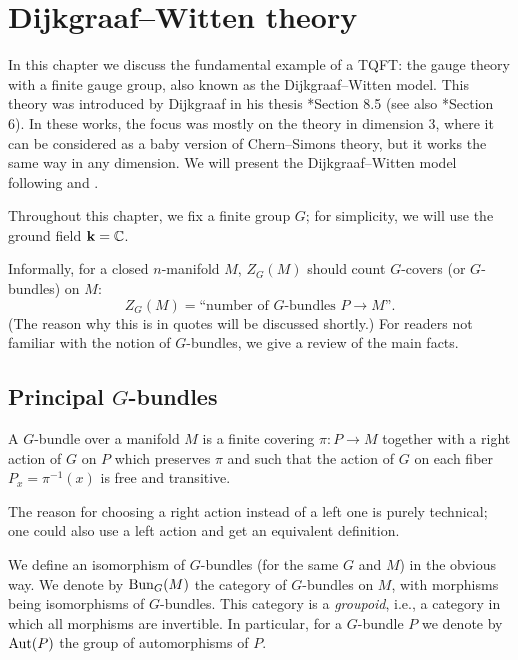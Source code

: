 \chapter{Dijkgraaf--Witten theory}\label{c:DW}
In this chapter we discuss the fundamental example of a TQFT:
the gauge theory with a finite gauge group, also known as the Dijkgraaf--Witten
model. This theory was introduced by Dijkgraaf in his thesis
*{Section 8.5} (see also *{Section 6}). In
these works, the focus was mostly on the theory in dimension 3, where it can be
considered as a baby version of Chern--Simons theory, but it works the same way
in any dimension. We will present the Dijkgraaf--Witten model following
 and .

Throughout this chapter, we fix a finite group $G$; for simplicity, we will
use the ground field $\mathbf{k}=\mathbb{C}$.

Informally, for a closed $n$-manifold $M$, $Z_G(M)$ should count $G$-covers
(or $G$-bundles) on $M$:
\begin{equation}\label{e:dw-informal}
  Z_G(M)=\text{``number of $G$-bundles $P\to M$''}.
\end{equation}
(The reason why this is in quotes will be discussed shortly.) For readers
not familiar with the notion of $G$-bundles, we give a review of the main
facts.

\section{Principal $G$-bundles}\label{s:principal-bundles}

\begin{definition}\label{d:G-bundle}
  A $G$-bundle over a manifold $M$ is a finite covering $\pi\colon P\to M$
  together with a right action of $G$ on $P$ which preserves $\pi$ and
  such that the action of $G$ on each fiber $P_x=\pi^{-1}(x)$ is free and
  transitive.
\end{definition}
The reason for choosing a right action instead of a left one is purely
technical; one could also use a left action and get an equivalent definition.

We define an isomorphism of $G$-bundles (for the same $G$ and $M$) in the
obvious way. We denote by $\operatorname{Bun}_G(M)$ the category of $G$-bundles on $M$, with
morphisms being isomorphisms of $G$-bundles. This category is a
\emph{groupoid}, i.e., a category in which all morphisms are
invertible. In particular, for a $G$-bundle $P$ we denote by $\operatorname{Aut}(P)$ the group
of automorphisms of $P$.

